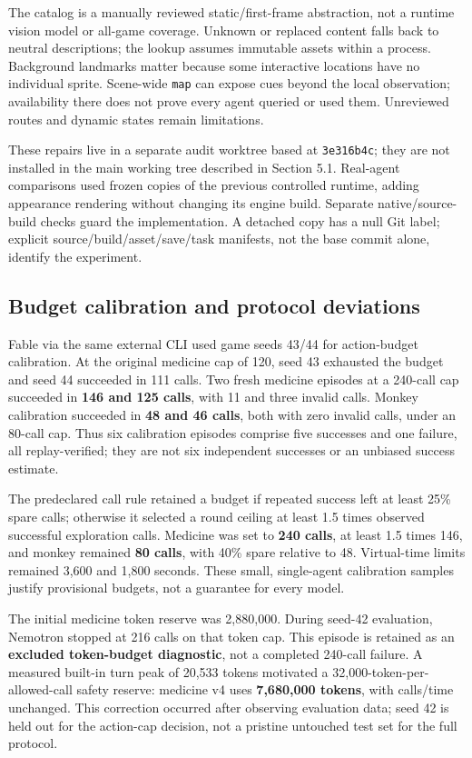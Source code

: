 \documentclass[11pt,a4paper]{article}
\begin{document}
The catalog is a manually reviewed static/first-frame abstraction, not a runtime vision model or all-game coverage. Unknown or replaced content falls back to neutral descriptions; the lookup assumes immutable assets within a process. Background landmarks matter because some interactive locations have no individual sprite. Scene-wide \texttt{map} can expose cues beyond the local observation; availability there does not prove every agent queried or used them. Unreviewed routes and dynamic states remain limitations.

These repairs live in a separate audit worktree based at \texttt{3e316b4c}; they are not installed in the main working tree described in Section 5.1. Real-agent comparisons used frozen copies of the previous controlled runtime, adding appearance rendering without changing its engine build. Separate native/source-build checks guard the implementation. A detached copy has a null Git label; explicit source/build/asset/save/task manifests, not the base commit alone, identify the experiment.

\subsection{\texorpdfstring{Budget calibration and protocol deviations}{Budget calibration and protocol deviations}}

Fable via the same external CLI used game seeds 43/44 for action-budget calibration. At the original medicine cap of 120, seed 43 exhausted the budget and seed 44 succeeded in 111 calls. Two fresh medicine episodes at a 240-call cap succeeded in \textbf{146 and 125 calls}, with 11 and three invalid calls. Monkey calibration succeeded in \textbf{48 and 46 calls}, both with zero invalid calls, under an 80-call cap. Thus six calibration episodes comprise five successes and one failure, all replay-verified; they are not six independent successes or an unbiased success estimate.

The predeclared call rule retained a budget if repeated success left at least 25\% spare calls; otherwise it selected a round ceiling at least 1.5 times observed successful exploration calls. Medicine was set to \textbf{240 calls}, at least 1.5 times 146, and monkey remained \textbf{80 calls}, with 40\% spare relative to 48. Virtual-time limits remained 3,600 and 1,800 seconds. These small, single-agent calibration samples justify provisional budgets, not a guarantee for every model.

The initial medicine token reserve was 2,880,000. During seed-42 evaluation, Nemotron stopped at 216 calls on that token cap. This episode is retained as an \textbf{excluded token-budget diagnostic}, not a completed 240-call failure. A measured built-in turn peak of 20,533 tokens motivated a 32,000-token-per-allowed-call safety reserve: medicine v4 uses \textbf{7,680,000 tokens}, with calls/time unchanged. This correction occurred after observing evaluation data; seed 42 is held out for the action-cap decision, not a pristine untouched test set for the full protocol.
\end{document}
